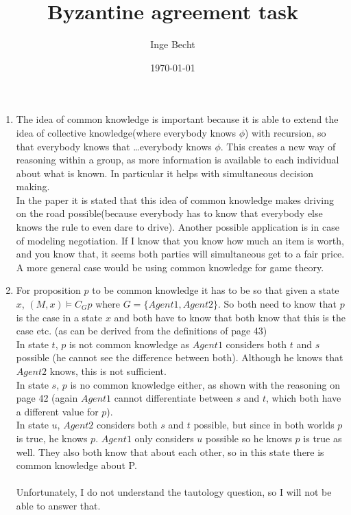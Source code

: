 \documentclass[12pt]{article} %
\begin{document}
\title{Byzantine agreement task}
\author{Inge Becht}
\date{\today}

\maketitle
\begin{enumerate}
    \item  The idea of common knowledge is important because it is able to
        extend the idea of collective knowledge(where everybody knows $\phi$) with recursion, so that
        everybody knows that \dots  everybody knows $\phi$.
        This creates a new way of reasoning within a group, as more information
        is available to each individual about what is known. In particular it
        helps with simultaneous decision making.
        \\
        In the paper it is stated that this idea of common knowledge makes
        driving on the road possible(because everybody has to know that
        everybody else knows the rule to even dare to drive).
        Another possible application is in case of modeling negotiation. If I know that
        you know how much an item  is worth, and you know that, it seems both parties
        will simultaneous get to a fair price. A more general case would be
        using common knowledge for game theory.
    \item For proposition $p$ to be common knowledge it has to be so that given a
        state $x$, $(M, x) \models C_G p$ where $G = \{Agent 1, Agent 2\}$. So both
        need to know that $p$ is the case in a state $x$ and both have to know that
        both know that this is the case etc. (as can be derived from the
        definitions of page 43)\\
        In state $t$, $p$ is not common knowledge as $Agent 1$ considers both
        $t$ and $s$
        possible (he cannot see the difference between both). Although he knows
        that $Agent 2$ knows, this is not sufficient.\\
        In state $s$, $p$ is no common knowledge either, as shown with the
        reasoning on page 42 (again $Agent 1$ cannot differentiate
        between $s$ and
        $t$, which both have a different value for $p$).\\
        In state $u$, $Agent 2$ considers both $s$ and $t$ possible, but since in both
        worlds $p$ is true, he knows $p$. $Agent 1$ only considers $u$ possible so
        he knows $p$ is true as well. They also both know that about each other,
        so in this state there is common knowledge about P.
        \\
        \\
        Unfortunately, I do not understand the tautology question, so I will not
        be able to answer that.


\end{enumerate}
\end{document}
